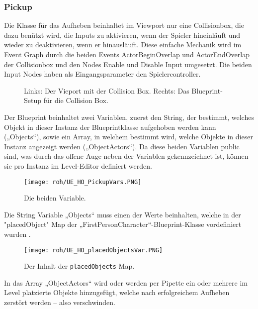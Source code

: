 \subsubsection{Pickup}
Die Klasse für das Aufheben beinhaltet im Viewport nur eine Collisionbox, die dazu benützt wird, die Inputs zu aktivieren, wenn der Spieler hineinläuft und wieder zu deaktivieren, wenn er hinausläuft. Diese einfache Mechanik wird im Event Graph durch die beiden Events ActorBeginOverlap und ActorEndOverlap der Collisionbox und den Nodes Enable und Disable Input umgesetzt. Die beiden Input Nodes haben als Eingangsparameter den Spielercontroller.
\begin{figure}[H]
    \caption{Links: Der Vieport mit der Collision Box. Rechts: Das Blueprint-Setup für die Collision Box.}
    \label{UE:HO_PickupCollBox}
\end{figure}
Der Blueprint beinhaltet zwei Variablen, zuerst den String, der bestimmt, welches Objekt in dieser Instanz der Blueprintklasse aufgehoben werden kann („Objects“), sowie ein Array, in welchem bestimmt wird, welche Objekte in dieser Instanz angezeigt werden („ObjectActors“). Da diese beiden Variablen public sind, was durch das offene Auge neben der Variablen gekennzeichnet ist, können sie pro Instanz im Level-Editor definiert werden.
\begin{figure}[H]
    \centering
    \texttt{[image: roh/UE\_HO\_PickupVars.PNG]}
    \caption{Die beiden Variable.}
    \label{UE:HO_PickupVars}
\end{figure}
Die String Variable „Objects“ muss einen der Werte beinhalten, welche in der "placedObject" Map der „FirstPersonCharacter“-Blueprint-Klasse vordefiniert wurden .
\begin{figure}[H]
    \centering
    \texttt{[image: roh/UE\_HO\_placedObjectsVar.PNG]}
    \caption{Der Inhalt der {\tt placedObjects} Map.}
    \label{UE:HO_placedObjectsVar}
\end{figure}
In das Array „ObjectActors“ wird oder werden per Pipette ein oder mehrere im Level platzierte Objekte hinzugefügt, welche nach erfolgreichem Aufheben zerstört werden – also verschwinden.

